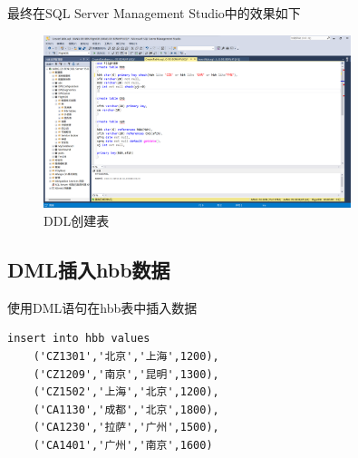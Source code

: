 \documentclass[UTF8,12pt]{article}
\begin{document}
最终在SQL Server Management Studio中的效果如下
\begin{figure}[htbp]
    \centering
    \includegraphics[width=0.8\textwidth]{img/2.png}
    \caption{DDL创建表}
\end{figure}

\subsection{DML插入hbb数据}
使用DML语句在hbb表中插入数据
\begin{lstlisting}[title=DML插入hbb数据,frame=shadowbox]
    insert into hbb values
    ('CZ1301','北京','上海',1200),
    ('CZ1209','南京','昆明',1300),
    ('CZ1502','上海','北京',1200),
    ('CA1130','成都','北京',1800),
    ('CA1230','拉萨','广州',1500),
    ('CA1401','广州','南京',1600)
\end{lstlisting}
\end{document}
